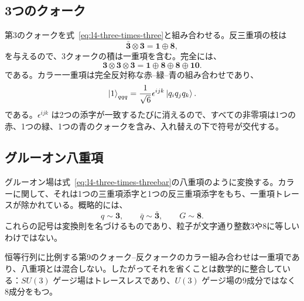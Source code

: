 \subsection{3つのクォーク}

第3のクォークを式~\eqref{eq:l4-three-times-three}と組み合わせる。反三重項の枝は
\begin{equation}
\bar{\boldsymbol 3}\otimes\boldsymbol 3
=\boldsymbol 1\oplus\boldsymbol 8,
\end{equation}
を与えるので、3クォークの積は一重項を含む。完全には、
\begin{equation}
\boldsymbol 3\otimes\boldsymbol 3\otimes\boldsymbol 3
=\boldsymbol 1\oplus\boldsymbol 8\oplus\boldsymbol 8
\oplus\boldsymbol{10}.
\label{eq:l4-three-quark-full}
\end{equation}
である。カラー一重項は完全反対称な赤--緑--青の組み合わせであり、
\begin{equation}
\left\lvert1\right\rangle_{qqq}
=\frac{1}{\sqrt6}\epsilon^{ijk}\left\lvert q_iq_jq_k\right\rangle.
\label{eq:l4-baryon-singlet}
\end{equation}
である。\(\epsilon^{ijk}\) は2つの添字が一致するたびに消えるので、すべての非零項は1つの赤、1つの緑、1つの青のクォークを含み、入れ替えの下で符号が交代する。

\begin{classroomqa}
\end{classroomqa}

\subsection{グルーオン八重項}

グルーオン場は式~\eqref{eq:l4-three-times-threebar}の八重項のように変換する。カラーに関して、それは1つの三重項添字と1つの反三重項添字をもち、一重項トレースが除かれている。概略的には、
\begin{equation}
q\sim\boldsymbol 3,
\qquad
\bar q\sim\bar{\boldsymbol 3},
\qquad
G\sim\boldsymbol 8.
\end{equation}
これらの記号は変換則を名づけるものであり、粒子が文字通り整数3や8に等しいわけではない。

恒等行列に比例する第9のクォーク--反クォークのカラー組み合わせは一重項であり、八重項とは混合しない。したがってそれを省くことは数学的に整合している：\(SU(3)\) ゲージ場はトレースレスであり、\(U(3)\) ゲージ場の9成分ではなく8成分をもつ。

